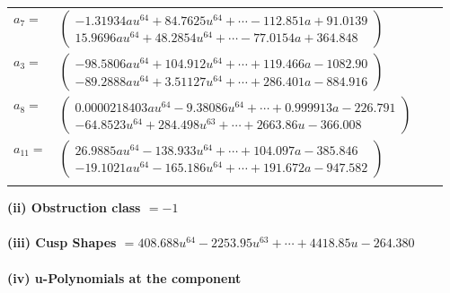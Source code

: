 \documentclass[1p]{elsarticle_modified}
\theoremstyle{definition}
\begin{document}
\begin{tabular}{m{7pt} m{180pt} m{7pt} m{180pt} }
\flushright $a_{7}=$&$\begin{pmatrix}-1.31934 a u^{64}+84.7625 u^{64}+\cdots-112.851 a+91.0139\\15.9696 a u^{64}+48.2854 u^{64}+\cdots-77.0154 a+364.848\end{pmatrix}$ \\
\flushright $a_{3}=$&$\begin{pmatrix}-98.5806 a u^{64}+104.912 u^{64}+\cdots+119.466 a-1082.90\\-89.2888 a u^{64}+3.51127 u^{64}+\cdots+286.401 a-884.916\end{pmatrix}$ \\
\flushright $a_{8}=$&$\begin{pmatrix}0.0000218403 a u^{64}-9.38086 u^{64}+\cdots+0.999913 a-226.791\\-64.8523 u^{64}+284.498 u^{63}+\cdots+2663.86 u-366.008\end{pmatrix}$ \\
\flushright $a_{11}=$&$\begin{pmatrix}26.9885 a u^{64}-138.933 u^{64}+\cdots+104.097 a-385.846\\-19.1021 a u^{64}-165.186 u^{64}+\cdots+191.672 a-947.582\end{pmatrix}$\\&\end{tabular}
\flushleft \textbf{(ii) Obstruction class $= -1$}\\~\\
\flushleft \textbf{(iii) Cusp Shapes $= 408.688 u^{64}-2253.95 u^{63}+\cdots+4418.85 u-264.380$}\\~\\
\newpage\renewcommand{\arraystretch}{1}
\flushleft \textbf{(iv) u-Polynomials at the component}\newline \\
\end{document}
